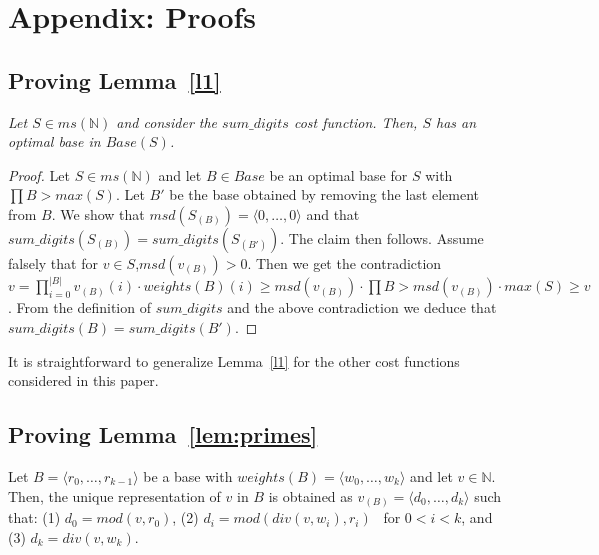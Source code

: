 \documentclass[envcountsame]{llncs}
\newcommand\tuple[1]{\langle #1 \rangle}
\newcommand{\Base}{\mathit{Base}}
\newcommand{\intMultiSet}{\mathit{ms(\mathbb{N})}}
\newcommand{\sumDigits}{\mathit{sum\_digits}}
\begin{document}
\appendix

\section{Appendix: Proofs}\label{apdx}

\newcommand{\apdxtheoremlike}[1]{\par\medskip\penalty-250{\bfseries\scshape\noindent#1}\slshape}

\subsection{Proving Lemma~\ref{l1}}

\noindent\apdxtheoremlike{Lemma~\ref{l1}.}
Let $S \in \intMultiSet$ and consider the $\sumDigits$ cost
function. Then, $S$ has an optimal base in $\Base(S)$.


\begin{proof}
  Let $S\in\intMultiSet$ and let $B\in\Base$ be an optimal base for
  $S$ with $\prod B > max(S)$. Let $B'$ be the base obtained by
  removing the last element from $B$.  We show that $msd(S_{(B)}) =
  \tuple{0, \ldots, 0}$ and that $\sumDigits(S_{(B)}) =
  \sumDigits(S_{(B')})$. The claim then follows.
Assume falsely that for $v \in S$,\linebreak $msd(v_{(B)})>0$.
  Then we get the contradiction $v =
  \prod_{i=0}^{|B|}v_{(B)}(i) \cdot weights(B)(i) \geq msd(v_{(B)})
  \cdot \prod B > msd(v_{(B)}) \cdot max(S) \geq v$.
  From the definition of $\sumDigits$ and the above
  contradiction we deduce that $\sumDigits(B)= \sumDigits(B')$.
\end{proof}

It is straightforward to generalize Lemma~\ref{l1} for the other cost
functions considered in this paper. 

\subsection{Proving Lemma~\ref{lem:primes}} 

\begin{proposition} \label{pNib} Let $B=\tuple{r_0,\ldots,r_{k-1}}$ be a base with
  $weights(B)=\tuple{w_0,\ldots,w_k}$ and let $v\in\mathbb{N}$.  
  Then, the unique representation of $v$ in $B$ is obtained as
  $v_{(B)}=\tuple{d_0,\ldots,d_k}$ such that:
(1) $d_0 = mod(v,r_0)$,             
(2) $d_i = mod( div(v,w_i) , r_i)$ \ for $0<i<k$, and
(3) $d_k = div(v,w_k)$.
\end{proposition}
\end{document}
